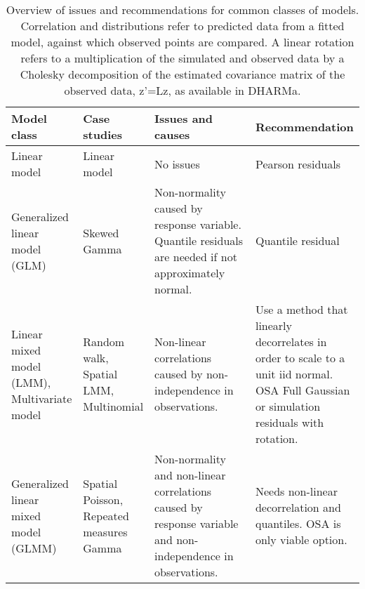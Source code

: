 \begin{table}[h]
    \caption{Overview of issues and recommendations for common classes of models. Correlation and distributions refer to predicted data from a fitted model, against which observed points are compared. A linear rotation refers to a multiplication of the simulated and observed data by a Cholesky decomposition of the estimated covariance matrix of the observed data, z’=Lz, as available in DHARMa.}
    \begin{tabular}{p{0.18\linewidth} p{0.18\linewidth}p{0.33\linewidth}p{0.33\linewidth}}
    \toprule
    Model class & Case studies & Issues and causes & Recommendation\\
    \hline
    Linear model & Linear model & No issues & Pearson residuals \\
    Generalized linear model (GLM) &
    Skewed Gamma &
    Non-normality caused by response variable. Quantile residuals are needed if not approximately normal. &
    Quantile residual \\
    Linear mixed model (LMM), Multivariate model
 &
    Random walk, Spatial LMM, Multinomial &
    Non-linear correlations caused by non-independence  in observations. &
    Use a method that linearly decorrelates in order to scale to a unit iid normal. OSA Full Gaussian  or simulation residuals with rotation. \\
    Generalized linear mixed model (GLMM) &
    Spatial Poisson, Repeated measures Gamma &
    Non-normality and non-linear correlations caused by response variable and non-independence in observations.&
    Needs non-linear decorrelation and quantiles. OSA is only viable option.\\
    \bottomrule
    \end{tabular}
    \end{table}
